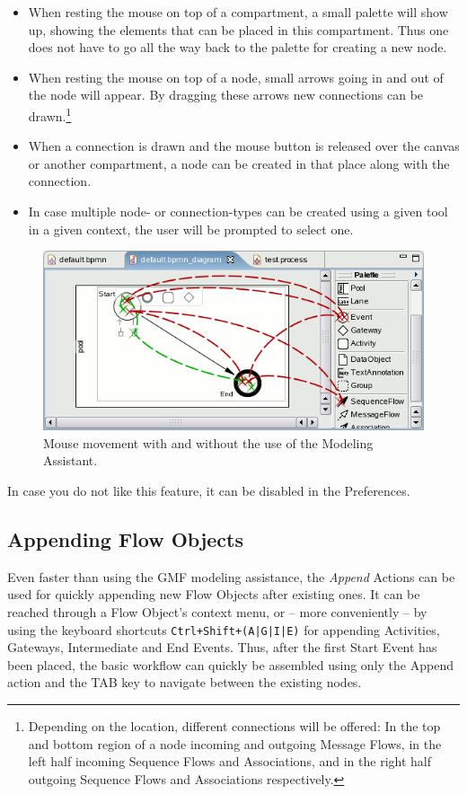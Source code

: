 \begin{itemize}
	\item When resting the mouse on top of a compartment, a small palette will
	show up, showing the elements that can be placed in this compartment.  Thus
	one does not have to go all the way back to the palette for creating a new
	node.
	
	\item When resting the mouse on top of a node, small arrows going in and out
	of the node will appear.  By dragging these arrows new connections can be
	drawn.\footnote{Depending on the location, different connections will be
	offered: In the top and bottom region of a node incoming and outgoing Message
	Flows, in the left half incoming Sequence Flows and Associations, and in the
	right half outgoing Sequence Flows and Associations respectively.}
	
	\item When a connection is drawn and the mouse button is released over the
	canvas or another compartment, a node can be created in that place along with
	the connection.
	
	\item In case multiple node- or connection-types can be created using a given
	tool in a given context, the user will be prompted to select one.
\end{itemize}

\begin{figure}[ht]
	\centering
	\includegraphics[width=.5\textwidth]{figures/features/modellingAssistant.png}
	\caption{Mouse movement with and without the use of the Modeling Assistant.}
	\label{fig:modAss}
\end{figure}

In case you do not like this feature, it can be disabled in the Preferences.



\subsection{Appending Flow Objects}
Even faster than using the GMF modeling assistance, the \emph{Append} Actions can
be used for quickly appending new Flow Objects after existing ones.  It can be
reached through a Flow Object's context menu, or -- more conveniently -- by
using the keyboard shortcuts \texttt{Ctrl+Shift+(A|G|I|E)} for appending Activities,
Gateways, Intermediate and End Events.  Thus, after the first Start Event has
been placed, the basic workflow can quickly be assembled using only the Append
action and the TAB key to navigate between the existing nodes.


